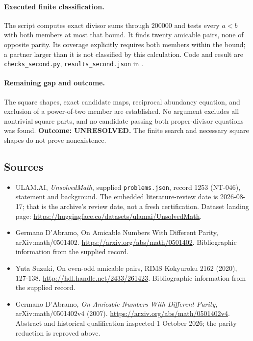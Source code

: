 \documentclass[11pt,a4paper]{article}
\begin{document}
\paragraph{Executed finite classification.}
The script computes exact divisor sums through $200000$ and tests
every $a<b$ with both members at most that bound. It finds twenty
amicable pairs, none of opposite parity. Its coverage explicitly
requires both members within the bound; a partner larger than it is
not classified by this calculation. Code and result are
\texttt{checks\_second.py}, \texttt{results\_second.json} in
.

\paragraph{Remaining gap and outcome.}
The square shapes, exact candidate maps, reciprocal abundancy equation,
and exclusion of a power-of-two member are established. No argument
excludes all nontrivial square parts, and no candidate passing both
proper-divisor equations was found. \textbf{Outcome: UNRESOLVED.}
The finite search and necessary square shapes do not prove nonexistence.

\subsection{Sources}

{\small

\begin{itemize}

\item[\hypertarget{source:1253:1}{S1}] ULAM.AI, \emph{UnsolvedMath}, supplied \texttt{problems.json}, record 1253 (NT-046), statement and background. The embedded literature-review date is 2026-08-17; that is the archive’s review date, not a fresh certification. Dataset landing page: \url{https://huggingface.co/datasets/ulamai/UnsolvedMath}.

\item[\hypertarget{source:1253:2}{S2}] Germano D'Abramo, On Amicable Numbers With Different Parity, arXiv:math/0501402. \url{https://arxiv.org/abs/math/0501402}. Bibliographic information from the supplied record.

\item[\hypertarget{source:1253:3}{S3}] Yuta Suzuki, On even-odd amicable pairs, RIMS Kokyuroku 2162 (2020), 127-138. \url{http://hdl.handle.net/2433/261423}. Bibliographic information from the supplied record.


\item[E1] Germano D'Abramo, \emph{On Amicable Numbers With Different
Parity}, arXiv:math/0501402v4 (2007).
\url{https://arxiv.org/abs/math/0501402v4}. Abstract and historical
qualification inspected 1 October 2026; the parity reduction is reproved above.

\end{itemize}

}

\label{end:1253}
\end{document}
